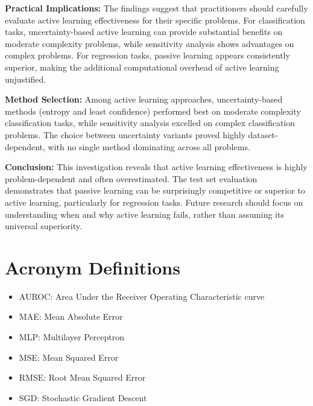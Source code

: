 \documentclass[conference]{IEEEtran}
\begin{document}
\textbf{Practical Implications:} The findings suggest that practitioners should carefully evaluate active learning effectiveness for their specific problems. For classification tasks, uncertainty-based active learning can provide substantial benefits on moderate complexity problems, while sensitivity analysis shows advantages on complex problems. For regression tasks, passive learning appears consistently superior, making the additional computational overhead of active learning unjustified.

\textbf{Method Selection:} Among active learning approaches, uncertainty-based methods (entropy and least confidence) performed best on moderate complexity classification tasks, while sensitivity analysis excelled on complex classification problems. The choice between uncertainty variants proved highly dataset-dependent, with no single method dominating across all problems.

\textbf{Conclusion:} This investigation reveals that active learning effectiveness is highly problem-dependent and often overestimated. The test set evaluation demonstrates that passive learning can be surprisingly competitive or superior to active learning, particularly for regression tasks. Future research should focus on understanding when and why active learning fails, rather than assuming its universal superiority.




\section*{Acronym Definitions}
\begin{itemize}
\item AUROC: Area Under the Receiver Operating Characteristic curve
\item MAE: Mean Absolute Error
\item MLP: Multilayer Perceptron
\item MSE: Mean Squared Error
\item RMSE: Root Mean Squared Error
\item SGD: Stochastic Gradient Descent
\end{itemize}
\end{document}

